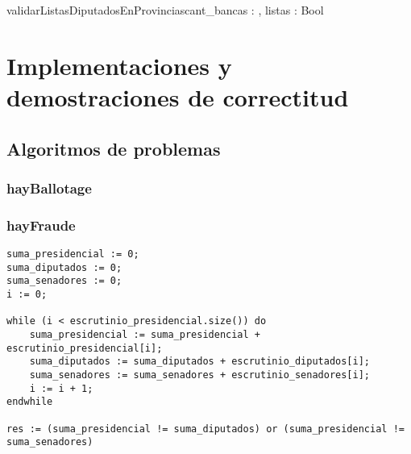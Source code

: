 \documentclass[10pt,a4paper]{article}
\begin{document}
\begin{proc}{validarListasDiputadosEnProvincias}{\In cant\_bancas : \ent , \In listas : }{Bool}



\vspace{5mm}

\vspace{5mm}

\end{proc}

\section{Implementaciones y demostraciones de correctitud}
\subsection{Algoritmos de problemas}
\subsubsection{hayBallotage}

\subsubsection{hayFraude}

\begin{lstlisting}[caption={},label=code:for]
suma_presidencial := 0;
suma_diputados := 0;
suma_senadores := 0;
i := 0;

while (i < escrutinio_presidencial.size()) do
    suma_presidencial := suma_presidencial + escrutinio_presidencial[i];
    suma_diputados := suma_diputados + escrutinio_diputados[i];
    suma_senadores := suma_senadores + escrutinio_senadores[i];
    i := i + 1;
endwhile

res := (suma_presidencial != suma_diputados) or (suma_presidencial != suma_senadores)
	\end{lstlisting}
\end{document}
